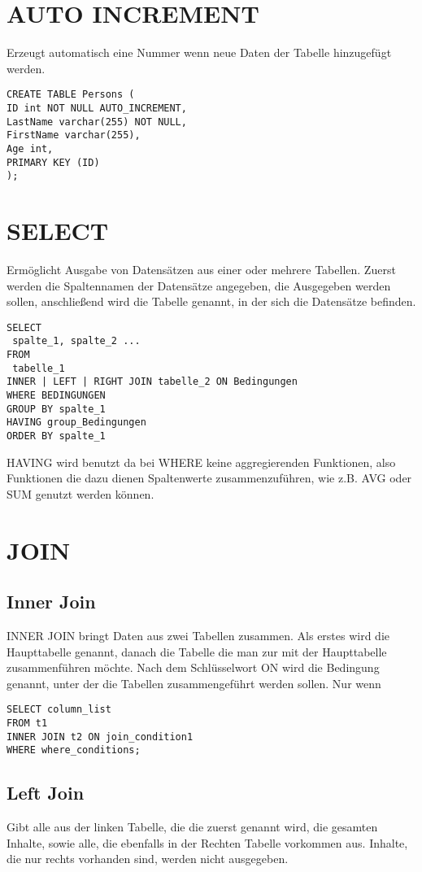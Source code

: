 \documentclass[fleqn,10pt]{SelfArx} %
\begin{document}
\section{AUTO INCREMENT}
Erzeugt automatisch eine Nummer wenn neue Daten der Tabelle hinzugefügt werden. 
\begin{verbatim}
CREATE TABLE Persons (
ID int NOT NULL AUTO_INCREMENT,
LastName varchar(255) NOT NULL,
FirstName varchar(255),
Age int,
PRIMARY KEY (ID)
);
\end{verbatim}
\clearpage
\section{SELECT}
Ermöglicht Ausgabe von Datensätzen aus einer oder mehrere Tabellen. Zuerst werden die Spaltennamen der Datensätze angegeben, die Ausgegeben werden sollen, anschließend wird die Tabelle genannt, in der sich die Datensätze befinden.
\begin{verbatim}
SELECT 
 spalte_1, spalte_2 ... 
FROM 
 tabelle_1 
INNER | LEFT | RIGHT JOIN tabelle_2 ON Bedingungen 
WHERE BEDINGUNGEN 
GROUP BY spalte_1 
HAVING group_Bedingungen 
ORDER BY spalte_1
\end{verbatim}
HAVING wird benutzt da bei WHERE keine aggregierenden  Funktionen, also Funktionen die dazu dienen Spaltenwerte zusammenzuführen, wie z.B. AVG oder SUM genutzt werden können.

\section{JOIN}
\subsection{Inner Join}
INNER JOIN bringt Daten aus zwei Tabellen zusammen. Als erstes wird die Haupttabelle genannt, danach die Tabelle die man zur mit der Haupttabelle zusammenführen möchte. Nach dem Schlüsselwort ON wird die Bedingung genannt, unter der die Tabellen zusammengeführt werden sollen.
Nur wenn 

\begin{verbatim}
SELECT column_list
FROM t1
INNER JOIN t2 ON join_condition1
WHERE where_conditions;
\end{verbatim}

\subsection{Left Join}

Gibt alle aus der linken Tabelle, die die zuerst genannt wird, die gesamten Inhalte, sowie alle, die ebenfalls in der Rechten Tabelle vorkommen aus. Inhalte, die nur rechts vorhanden sind, werden nicht ausgegeben. 
\end{document}
